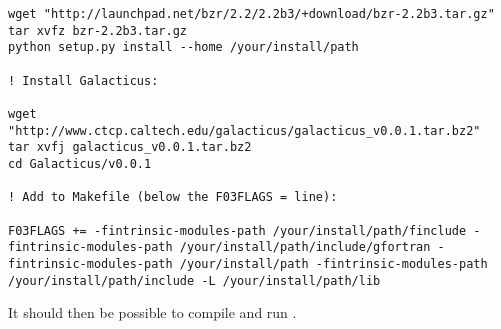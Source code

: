 \begin{lstlisting}[language=simple,stringstyle=\ttfamily,commentstyle=\itshape]
wget "http://launchpad.net/bzr/2.2/2.2b3/+download/bzr-2.2b3.tar.gz"
tar xvfz bzr-2.2b3.tar.gz
python setup.py install --home /your/install/path

! Install Galacticus:

wget "http://www.ctcp.caltech.edu/galacticus/galacticus_v0.0.1.tar.bz2"
tar xvfj galacticus_v0.0.1.tar.bz2
cd Galacticus/v0.0.1

! Add to Makefile (below the F03FLAGS = line):

F03FLAGS += -fintrinsic-modules-path /your/install/path/finclude -fintrinsic-modules-path /your/install/path/include/gfortran -fintrinsic-modules-path /your/install/path -fintrinsic-modules-path /your/install/path/include -L /your/install/path/lib
\end{lstlisting}

It should then be possible to compile and run \glc.

